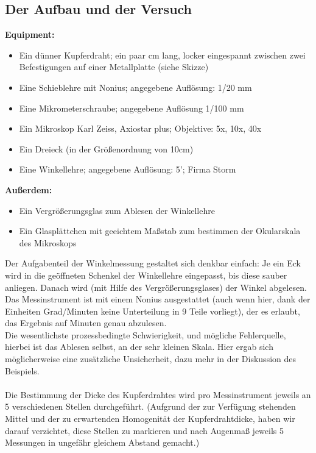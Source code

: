 \documentclass[12pt,a4paper]{article}
\begin{document}
\begin{multicols}{2}
\subsection{Der Aufbau und der Versuch}
\textbf{Equipment:}
\begin{itemize}
	\item Ein dünner Kupferdraht; ein paar cm lang, locker eingespannt zwischen zwei Befestigungen auf einer Metallplatte (siehe Skizze)
	\item Eine Schieblehre mit Nonius; angegebene Auflösung: 1/20 mm
	\item Eine Mikrometerschraube; angegebene Auflösung 1/100 mm
	\item Ein Mikroskop Karl Zeiss, Axiostar plus; Objektive: 5x, 10x, 40x 
	\item Ein Dreieck (in der Größenordnung von 10cm)
	\item Eine Winkellehre; angegebene Auflösung: 5'; Firma Storm
\end{itemize}
\textbf{Außerdem:}
\begin{itemize}
	\item Ein Vergrößerungsglas zum Ablesen der Winkellehre
	\item Ein Glasplättchen mit geeichtem Maßstab zum bestimmen der Okularskala des Mikroskops
\end{itemize}
Der Aufgabenteil der Winkelmessung gestaltet sich denkbar einfach: Je ein Eck wird in die geöffneten Schenkel der Winkellehre eingepasst, bis diese sauber anliegen. Danach wird (mit Hilfe des Vergrößerungsglases) der Winkel abgelesen.\\
Das Messinstrument ist mit einem Nonius ausgestattet (auch wenn hier, dank der Einheiten Grad/Minuten keine Unterteilung in 9 Teile vorliegt), der es erlaubt, das Ergebnis auf Minuten genau abzulesen.\\
Die wesentlichste prozessbedingte Schwierigkeit, und mögliche Fehlerquelle, hierbei ist das Ablesen selbst, an der sehr kleinen Skala. Hier ergab sich möglicherweise eine zusätzliche Unsicherheit, dazu mehr in der Diskussion des Beispiels.\\
\\
Die Bestimmung der Dicke des Kupferdrahtes wird pro Messinstrument jeweils an 5 verschiedenen Stellen durchgeführt. (Aufgrund der zur Verfügung stehenden Mittel und der zu erwartenden Homogenität der Kupferdrahtdicke, haben wir darauf verzichtet, diese Stellen zu markieren und nach Augenmaß jeweils 5 Messungen in ungefähr gleichem Abstand gemacht.)\\

\end{multicols}
\end{document}
